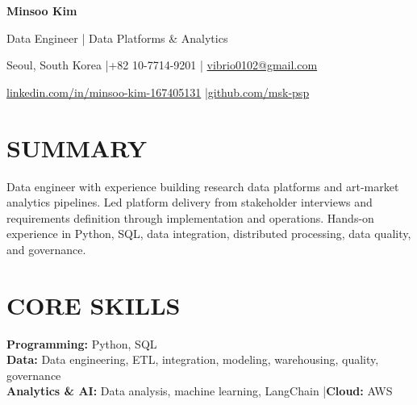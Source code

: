 \documentclass[a4paper,10pt]{article}
\begin{document}
\fontsize{10.5}{13}\selectfont
{\fontsize{27}{32}\selectfont\bfseries\color{accent}Minsoo Kim}\par
\vspace{3pt}
{\fontsize{12}{15}\selectfont Data Engineer | Data Platforms \& Analytics}\par
\vspace{5pt}
{\small Seoul, South Korea \enspace|\enspace +82 10-7714-9201 \enspace|\enspace
\href{mailto:vibrio0102@gmail.com}{vibrio0102@gmail.com}}\par
\vspace{2pt}
{\small\href{https://www.linkedin.com/in/minsoo-kim-167405131}{linkedin.com/in/minsoo-kim-167405131}
\enspace|\enspace\href{https://github.com/msk-psp}{github.com/msk-psp}}\par

\section{SUMMARY}
Data engineer with experience building research data platforms and art-market analytics pipelines. Led platform delivery from stakeholder interviews and requirements definition through implementation and operations. Hands-on experience in Python, SQL, data integration, distributed processing, data quality, and governance.

\section{CORE SKILLS}
\textbf{Programming:} Python, SQL\\
\textbf{Data:} Data engineering, ETL, integration, modeling, warehousing, quality, governance\\
\textbf{Analytics \& AI:} Data analysis, machine learning, LangChain \enspace|\enspace \textbf{Cloud:} AWS
\end{document}
